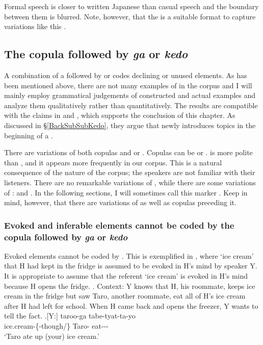 Formal speech is closer to written Japanese than casual speech
and the boundary between them is blurred.
Note, however, that
the  is a suitable format to capture variations like this \cite[see][]{croft10}.

\subsection{The copula followed by \textit{ga} or \textit{kedo}}\label{kedo}

A combination of a  followed by  or 
codes declining or unused elements.
As has been mentioned above,
there are not many examples of  in the corpus
and I will mainly employ grammatical judgements of constructed and actual examples
and analyze them qualitatively rather than quantitatively.
The results are compatible with the claims in  and ,
which supports the conclusion of this chapter.
As discussed in \S \ref{BackSubSubKedo},
they argue that  newly introduces topics in the beginning of a .

There are variations of both copulas and  or .
Copulas can be  or .
 is more polite than ,
and it appears more frequently in our corpus.
This is a natural consequence of the nature of the corpus;
the speakers are not familiar with their listeners.
There are no remarkable variations of ,
while there are some variations of :
 and .
In the following sections,
I will sometimes call this marker .
Keep in mind, however, that there are variations of  as well as copulas preceding it.

\subsubsection{Evoked and inferable elements cannot be coded by the copula followed by \textit{ga} or \textit{kedo}}

Evoked elements cannot be coded by .
This is exemplified in \Next,
where `ice cream' that H had kept in the fridge is assumed to be evoked in H's mind by speaker Y.
It is appropriate to assume that the referent `ice cream' is evoked in H's mind
because H opens the fridge.
%
\ex. Context: Y knows that H, his roommate, keeps ice cream in the fridge
	but saw Taro, another roommate, eat all of H's ice cream after H had left for school.
	When H came back and opens the freezer,
	Y wants to tell the fact.
	\ag.[Y:]  taroo-ga tabe-tyat-ta-yo \\
		ice.cream-\{-though/\} Taro- eat--- \\
		`Taro ate up (your) ice cream.'

